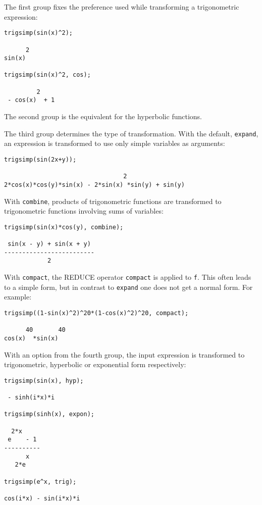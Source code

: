 \documentclass[11pt]{article}
\newcommand{\REDUCE}{REDUCE}
\begin{document}
The first group fixes the preference used while transforming a
trigonometric expression:
\begin{verbatim}
trigsimp(sin(x)^2);

      2
sin(x)

trigsimp(sin(x)^2, cos);

         2
 - cos(x)  + 1
\end{verbatim}
The second group is the equivalent for the hyperbolic functions.

The third group determines the type of transformation.  With the
default, \texttt{expand}, an expression is transformed to use only
simple variables as arguments:
\begin{verbatim}
trigsimp(sin(2x+y));

                                 2
2*cos(x)*cos(y)*sin(x) - 2*sin(x) *sin(y) + sin(y)
\end{verbatim}
With \texttt{combine}, products of trigonometric functions are
transformed to trig\-onometric functions involving sums of variables:
\begin{verbatim}
trigsimp(sin(x)*cos(y), combine);

 sin(x - y) + sin(x + y)
-------------------------
            2
\end{verbatim}
With \texttt{compact}, the \REDUCE{} operator \texttt{compact}
\cite{hearns} is applied to \texttt{f}.  This often leads to a simple
form, but in contrast to \texttt{expand} one does not get a normal
form. For example:
\begin{verbatim}
trigsimp((1-sin(x)^2)^20*(1-cos(x)^2)^20, compact);

      40       40
cos(x)  *sin(x)
\end{verbatim}

With an option from the fourth group, the input expression is
transformed to trigonometric, hyperbolic or exponential form
respectively:
\begin{verbatim}
trigsimp(sin(x), hyp);

 - sinh(i*x)*i

trigsimp(sinh(x), expon);

  2*x
 e    - 1
----------
      x
   2*e

trigsimp(e^x, trig);

cos(i*x) - sin(i*x)*i
\end{verbatim}
\end{document}
